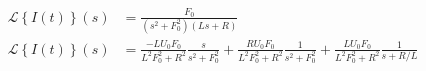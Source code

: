 \documentclass{article}
\newcommand{\Laplace}[1]{\mathcal{L}\left\{#1\right\}(s)}
\begin{document}
\begin{align*}
    \Laplace{I(t)}  & = \frac{F_0}{(s^2 + F_0^2)(Ls+R)} \\
    \Laplace{I(t)}  & = \frac{-L U_0 F_0}{L^2 F_0^2 + R^2}\frac{s}{s^2 + F_0^2} +  \frac{R U_0 F_0}{L^2 F_0^2 + R^2}\frac{1}{s^2 + F_0^2} + \frac{L U_0 F_0}{L^2 F_0^2 + R^2}\frac{1}{s + R/L}  \\
\end{align*}
\end{document}
